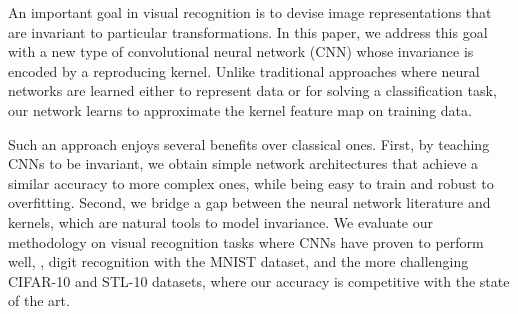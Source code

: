 An important goal in visual recognition is to devise image representations that
are invariant to particular transformations. In this paper, we address this
goal with a new type of convolutional neural network (CNN) whose invariance is
encoded by a reproducing kernel. Unlike traditional approaches where neural
networks are learned either to represent data or for solving a classification
task, our network learns to approximate the kernel feature map on training data.

Such an approach enjoys several benefits over classical ones.  First, by
teaching CNNs to be invariant, we obtain simple network architectures that
achieve a similar accuracy to more complex ones, while being easy to train and
robust to overfitting. Second, we bridge a gap between the neural network
literature and kernels, which are natural tools to model invariance.  We
evaluate our methodology on visual recognition tasks where CNNs have proven to
perform well, \eg, digit recognition with the MNIST dataset, and the more
challenging CIFAR-10 and STL-10 datasets, where our accuracy is competitive
with the state of the art.
